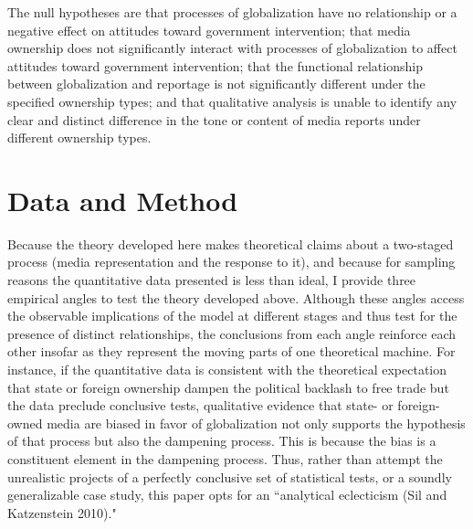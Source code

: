 \documentclass[12pt]{report}
\begin{document}
The null hypotheses are that processes of globalization have no relationship or a negative effect on attitudes toward government intervention; that media ownership does not significantly interact with processes of globalization to affect attitudes toward government intervention; that the functional relationship between globalization and reportage is not significantly different under the specified ownership types; and that qualitative analysis is unable to identify any clear and distinct difference in the tone or content of media reports under different ownership types.

\section{Data and Method}

Because the theory developed here makes theoretical claims about a two-staged process (media representation and the response to it), and because for sampling reasons the quantitative data presented is less than ideal, I provide three empirical angles to test the theory developed above. Although these angles access the observable implications of the model at different stages and thus test for the presence of distinct relationships, the conclusions from each angle reinforce each other insofar as they represent the moving parts of one theoretical machine. For instance, if the quantitative data is consistent with the theoretical expectation that state or foreign ownership dampen the political backlash to free trade but the data preclude conclusive tests, qualitative evidence that state- or foreign-owned media are biased in favor of globalization not only supports the hypothesis of that process but also the dampening process. This is because the bias is a constituent element in the dampening process. Thus, rather than attempt the unrealistic projects of a perfectly conclusive set of statistical tests, or a soundly generalizable case study, this paper opts for an ``analytical eclecticism (Sil and Katzenstein 2010)."
\end{document}
